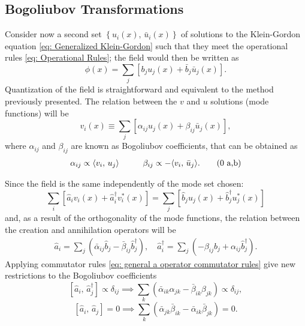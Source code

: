 \subsection{Bogoliubov Transformations}
Consider now a second set $\left\{u_i(x),\,\bar u_i(x)\right\}$ of solutions to the Klein-Gordon equation \ref{eq: Generalized Klein-Gordon} such that they meet the operational rules \ref{eq: Operational Rules}; the field would then be written as
\begin{equation}
	\phi(x)=\sum_j\left[b_ju_j(x)+\bar b_j\bar u_j(x)\right].
\end{equation}
Quantization of the field is straightforward and equivalent to the method previously presented. The relation between the $v$ and $u$ solutions (mode functions) will be
\begin{equation}
	v_i(x)\equiv\sum_j\left[\alpha_{ij}u_j(x)+\beta_{ij}\bar u_j(x)\right],
\end{equation}
where $\alpha_{ij}$ and $\beta_{ij}$ are known as Bogoliubov coefficients, that can be obtained as
\begin{subequations}\label{eq: Bogoliubov Coefficients General}
	\begin{gather}
		\alpha_{ij}\propto\langle v_i,\,u_j\rangle\hspace{1.0cm}\beta_{ij}\propto -\langle v_i,\,\bar u_j\rangle.\tag{\theequation \,\,a,b}
	\end{gather}
\end{subequations}

Since the field is the same independently of the mode set chosen:
\begin{equation}
	\sum_i\left[\hat{a}_iv_i(x)+\hat{a}_i^\dagger v^*_i(x)\right]=\sum_j\left[\hat{b}_ju_j(x)+\hat{b}_j^\dagger u_j^*(x)\right]
\end{equation}
and, as a result of the orthogonality of the mode functions, the relation between the creation and annihilation operators will be 
\begin{subequations}
	\begin{gather}
		\hat{a}_i=\sum_j\left(\bar \alpha_{ij}\hat{b}_j-\bar \beta_{ij}\hat{b}_j^\dagger\right),\quad \hat{a}_i^\dagger=\sum_j\left(-\beta_{ij}\hat{b}_j+\alpha_{ij}\hat{b}_j^\dagger\right).\tag{\theequation \,\,a,b}
	\end{gather}
\end{subequations}
Applying commutator rules \ref{eq: general a operator commutator rules} give new restrictions to the Bogoliubov coefficients
\begin{equation}
	\left[\hat{a}_i,\,\hat{a}_j^\dagger\right]\propto\delta_{ij}\implies \sum_k\left(\bar \alpha_{ik}\alpha_{jk}-\bar \beta_{ik}\beta_{jk}\right)\propto\delta_{ij},
\end{equation}
\begin{equation}
	\left[\hat{a}_i,\,\hat{a}_j\right]=0\implies \sum_k\left(\bar \alpha_{jk}\bar \beta_{ik}-\bar \alpha_{ik}\bar \beta_{jk}\right)=0.
\end{equation}

